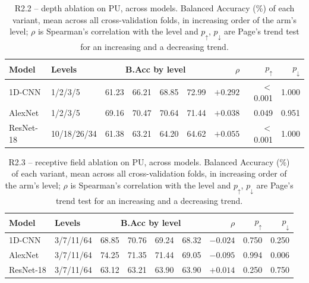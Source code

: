 
\begin{table}[ht]
\centering
\caption{R2.2 -- depth ablation on PU, across models. Balanced Accuracy (\%) of each variant, mean across all cross-validation folds, in increasing order of the arm's level; $\rho$ is Spearman's correlation with the level and $p_\uparrow$, $p_\downarrow$ are Page's trend test for an increasing and a decreasing trend.}
\label{tab:ablation_summary_depth_pu}
\begin{tabular}{@{}l l c c c c r r r@{}}
\toprule
\textbf{Model} & \textbf{Levels} & \multicolumn{4}{c}{\textbf{B.Acc by level}} & $\rho$ & $p_\uparrow$ & $p_\downarrow$ \\ \midrule
1D-CNN & 1/2/3/5 & 61.23 & 66.21 & 68.85 & 72.99 & $+0.292$ & $<$0.001 & 1.000 \\
AlexNet & 1/2/3/5 & 69.16 & 70.47 & 70.64 & 71.44 & $+0.038$ & 0.049 & 0.951 \\
ResNet-18 & 10/18/26/34 & 61.38 & 63.21 & 64.20 & 64.62 & $+0.055$ & $<$0.001 & 1.000 \\
\bottomrule
\end{tabular}
\end{table}

\begin{table}[ht]
\centering
\caption{R2.3 -- receptive field ablation on PU, across models. Balanced Accuracy (\%) of each variant, mean across all cross-validation folds, in increasing order of the arm's level; $\rho$ is Spearman's correlation with the level and $p_\uparrow$, $p_\downarrow$ are Page's trend test for an increasing and a decreasing trend.}
\label{tab:ablation_summary_kernel_pu}
\begin{tabular}{@{}l l c c c c r r r@{}}
\toprule
\textbf{Model} & \textbf{Levels} & \multicolumn{4}{c}{\textbf{B.Acc by level}} & $\rho$ & $p_\uparrow$ & $p_\downarrow$ \\ \midrule
1D-CNN & 3/7/11/64 & 68.85 & 70.76 & 69.24 & 68.32 & $-0.024$ & 0.750 & 0.250 \\
AlexNet & 3/7/11/64 & 74.25 & 71.35 & 71.44 & 69.05 & $-0.095$ & 0.994 & 0.006 \\
ResNet-18 & 3/7/11/64 & 63.12 & 63.21 & 63.90 & 63.90 & $+0.014$ & 0.250 & 0.750 \\
\bottomrule
\end{tabular}
\end{table}

